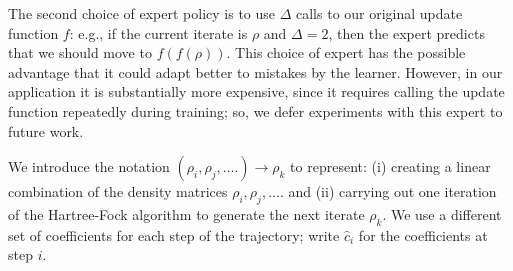 \documentclass[twoside,11pt]{article}
\begin{document}
The second choice of expert policy is to use $\Delta$ calls to our original update function $f$: e.g., if the current iterate is $\rho$ and $\Delta=2$, then the expert predicts that we should move to $f(f(\rho))$.  This choice of expert has the possible advantage that it could adapt better to mistakes by the learner. However, in our application it is substantially more expensive, since it requires calling the update function repeatedly during training; so, we defer experiments with this expert to future work.

We introduce the notation $(\rho_i, \rho_j, ....) \rightarrow \rho_k $ to represent: (i) creating a linear combination of the density matrices $\rho_i, \rho_j, ....$ and (ii) carrying out one iteration of the Hartree-Fock algorithm to generate the next iterate $\rho_k$.  We use a different set of coefficients for each step of the trajectory; write $\hat c_i$ for the coefficients at step $i$.



\end{document}
